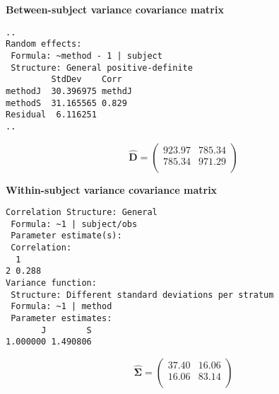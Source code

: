 \documentclass[compress]{beamer}        %
\makeatletter
\newcommand{\tcb}{\textcolor{beamer@blendedblue}}
\makeatother
\begin{document}
\begin{frame}[fragile]{\bf \tcb{Between-subject variance covariance matrix }}

\begin{verbatim}
..
Random effects:
 Formula: ~method - 1 | subject
 Structure: General positive-definite
         StdDev    Corr
methodJ  30.396975 methdJ
methodS  31.165565 0.829
Residual  6.116251
..
\end{verbatim}
\[
\hat{\boldsymbol{D}} = \left(
\begin{array}{cc}
923.97	& 785.34 \\
785.34	& 971.29\\
\end{array}\right)
\]
\end{frame}

\begin{frame}[fragile]{\bf \tcb{Within-subject variance covariance matrix}}
\begin{verbatim}
Correlation Structure: General
 Formula: ~1 | subject/obs
 Parameter estimate(s):
 Correlation:
  1
2 0.288
Variance function:
 Structure: Different standard deviations per stratum
 Formula: ~1 | method
 Parameter estimates:
       J        S
1.000000 1.490806
\end{verbatim}
\[
 \hat{\boldsymbol{\Sigma}} = \left(
\begin{array}{cc}
37.40 & 16.06 \\
16.06 & 83.14 \\
\end{array}\right)
\]
\end{frame}
\end{document}
